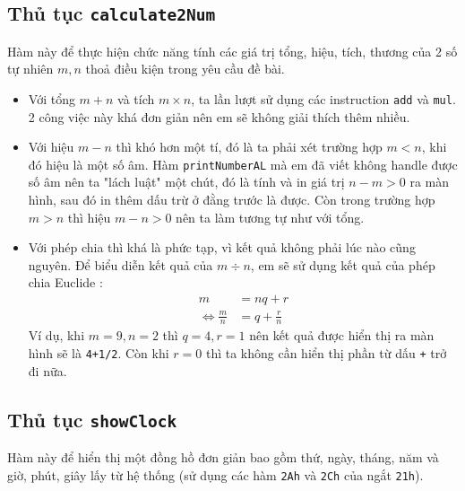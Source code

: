 \documentclass[12pt, final]{article}
\newcommand{\code}[1]{\texttt{#1}}
\begin{document}
\subsection{Thủ tục \texttt{calculate2Num}}
Hàm này để thực hiện chức năng tính các giá trị tổng, hiệu, tích, thương của 2 số tự nhiên $m, n$ thoả điều kiện trong yêu cầu đề bài.
\begin{itemize}
    \item Với tổng $m+n$ và tích $m\times n$, ta lần lượt sử dụng các instruction \texttt{add} và \texttt{mul}. 2 công việc này khá đơn giản nên em sẽ không giải thích thêm nhiều.
    \item Với hiệu $m-n$ thì khó hơn một tí, đó là ta phải xét trường hợp $m<n$, khi đó hiệu là một số âm. Hàm \texttt{printNumberAL} mà em đã viết không handle được số âm nên ta "lách luật" một chút, đó là tính và in giá trị $n-m > 0$ ra màn hình, sau đó in thêm dấu trừ ở đằng trước là được. Còn trong trường hợp $m>n$ thì hiệu $m-n>0$ nên ta làm tương tự như với tổng.
    \item Với phép chia thì khá là phức tạp, vì kết quả không phải lúc nào cũng nguyên. Để biểu diễn kết quả của $m\div n$, em sẽ sử dụng kết quả của phép chia Euclide \cite{euclide}:
    \begin{align*}
        m &= nq + r \\
        \Leftrightarrow \frac{m}{n} &= q + \frac{r}{n}
    \end{align*}
    Ví dụ, khi $m=9, n=2$ thì $q=4, r=1$ nên kết quả được hiển thị ra màn hình sẽ là \texttt{4+1/2}. Còn khi $r=0$ thì ta không cần hiển thị phần từ dấu \texttt{+} trở đi nữa.
\end{itemize}

\subsection{Thủ tục \code{showClock}}
Hàm này để hiển thị một đồng hồ đơn giản bao gồm thứ, ngày, tháng, năm và giờ, phút, giây lấy từ hệ thống (sử dụng các hàm \code{2Ah} và \code{2Ch} của ngắt \code{21h}).
\end{document}
